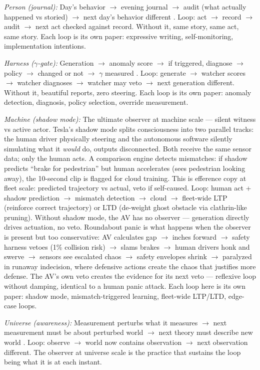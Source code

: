 \documentclass[11pt]{article}
\begin{document}
\textit{Person (journal):} Day's behavior $\to$ evening journal $\to$ audit (what actually happened vs storied) $\to$ next day's behavior different \citep{ghazali1106ihya}. Loop: act $\to$ record $\to$ audit $\to$ next act checked against record. Without it, same story, same act, same story. Each loop is its own paper: expressive writing, self-monitoring, implementation intentions.

\textit{Harness ($\gamma$-gate):} Generation $\to$ anomaly score $\to$ if triggered, diagnose $\to$ policy $\to$ changed or not $\to$ $\gamma$ measured \citep{macar2026,cao2026}. Loop: generate $\to$ watcher scores $\to$ watcher diagnoses $\to$ watcher may veto $\to$ next generation different. Without it, beautiful reports, zero steering. Each loop is its own paper: anomaly detection, diagnosis, policy selection, override measurement.

\textit{Machine (shadow mode):} The ultimate observer at machine scale --- silent witness vs active actor. Tesla's shadow mode splits consciousness into two parallel tracks: the human driver physically steering and the autonomous software silently simulating what it \emph{would} do, outputs disconnected. Both receive the same sensor data; only the human acts. A comparison engine detects mismatches: if shadow predicts ``brake for pedestrian'' but human accelerates (sees pedestrian looking away), the 10-second clip is flagged for cloud training. This is efference copy at fleet scale: predicted trajectory vs actual, veto if self-caused. Loop: human act + shadow prediction $\to$ mismatch detection $\to$ cloud $\to$ fleet-wide LTP (reinforce correct trajectory) or LTD (de-weight ghost obstacle via clathrin-like pruning). Without shadow mode, the AV has no observer --- generation directly drives actuation, no veto. Roundabout panic is what happens when the observer is present but too conservative: AV calculates gap $\to$ inches forward $\to$ safety harness vetoes (1\% collision risk) $\to$ slams brakes $\to$ human drivers honk and swerve $\to$ sensors see escalated chaos $\to$ safety envelopes shrink $\to$ paralyzed in runaway indecision, where defensive actions create the chaos that justifies more defense. The AV's own veto creates the evidence for its next veto --- reflexive loop without damping, identical to a human panic attack. Each loop here is its own paper: shadow mode, mismatch-triggered learning, fleet-wide LTP/LTD, edge-case loops.

\textit{Universe (awareness):} Measurement perturbs what it measures $\to$ next measurement must be about perturbed world $\to$ next theory must describe new world \citep{ibnarabi1238futuhat}. Loop: observe $\to$ world now contains observation $\to$ next observation different. The observer at universe scale is the practice that sustains the loop being what it is at each instant.
\end{document}
